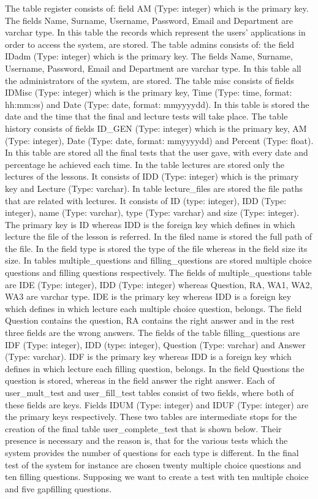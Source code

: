 \documentclass[10pt, conference, compsocconf]{IEEEtran}
\begin{document}
The table register consists of: field AM (Type: integer) which is the primary key. The fields Name, Surname, Username, Password, Email and Department are varchar type. In this table the records which represent the users’ applications in order to access the system, are stored.  The table admins consists of: the field IDadm (Type: integer) which is the primary key. The fields Name, Surname, Username, Password, Email and Department are varchar type. In this table all the administrators of the system, are stored. The table misc consists of fields IDMisc (Type: integer) which is the primary key, Time (Type: time, format: hh:mm:ss) and Date (Type: date, format: mm\-yyyy\-dd). In this table is stored the date and the time that the final and lecture tests will take place. 
The table history consists of fields ID\_GEN (Type: integer) which is the primary key, AM (Type: integer), Date (Type: date, format: mm\-yyyy\-dd) and Percent (Type: float). In this table are stored all the final tests that the user gave, with every date and percentage he achieved each time.  In the table lectures are stored only the lectures of the lessons. It consists of IDD (Type: integer) which is the primary key and Lecture (Type: varchar). In table lecture\_files are stored the file paths that are related with lectures. It consists of ID (type: integer), IDD (Type: integer), name (Type: varchar), type (Type: varchar) and size (Type: integer). The primary key is ID whereas IDD is the foreign key which defines in which lecture the file of the lesson is referred. In the filed name is stored the full path of the file. In the field type is stored the type of the file whereas in the field size its size.    In tables multiple\_questions and filling\_questions are stored multiple choice questions and filling questions respectively. The fields of multiple\_questions table are IDE (Type: integer), IDD (Type: integer) whereas Question, RA, WA1, WA2, WA3 are varchar type. IDE is the primary key whereas IDD is a foreign key which defines in which lecture each multiple choice question, belongs. The field Question contains the question, RA contains the right answer and in the rest three fields are the wrong answers.  The fields of the table filling\_questions are IDF (Type: integer), IDD (type: integer), Question (Type: varchar) and Answer (Type: varchar). IDF is the primary key whereas IDD is a foreign key which defines in which lecture each filling question, belongs. In the field Questions the question is stored, whereas in the field answer the right answer. Each of user\_mult\_test and user\_fill\_test tables consist of two fields, where both of these fields are keys. Fields IDUM (Type: integer) and IDUF (Type: integer) are the primary keys respectively. These two tables are intermediate stops for the creation of the final table user\_complete\_test that is shown below. Their presence is necessary and the reason is, that for the various tests which the system provides the number of questions for each type is different. In the final test of the system for instance are chosen twenty multiple choice questions and ten filling questions. Supposing we want to create a test with ten multiple choice and five gap\-filling questions. 
\end{document}
